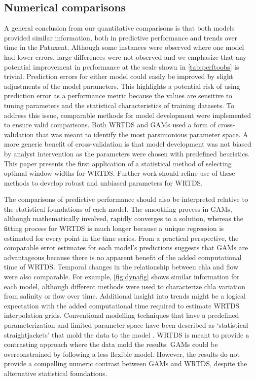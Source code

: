 \documentclass[letterpaper,12pt,oneside]{article}\usepackage[]{graphicx}\usepackage[]{color}
\begin{document}
\subsection*{Numerical comparisons}

A general conclusion from our quantitative comparisons is that both models provided similar information, both in predictive performance and trends over time in the Patuxent.  Although some instances were observed where one model had lower errors,  large differences were not observed and we emphasize that any potential improvement in performance at the scale shown in \cref{tab:perftoobs} is trivial.  Prediction errors for either model could easily be improved by slight adjustments of the model parameters.  This highlights a potential risk of using prediction error as a performance metric because the values are sensitive to tuning parameters and the statistical characteristics of training datasets. To address this issue, comparable methods for model development were implemented to ensure valid comparisons.  Both \ac{WRTDS} and \acp{GAM} used a form of cross-validation that was meant to identify the most parsimonious parameter space.  A more generic benefit of cross-validation is that model development was not biased by analyst intervention as the parameters were chosen with predefined heuristics.  This paper presents the first application of a statistical method of selecting optimal window widths for \ac{WRTDS}.  Further work should refine use of these methods to develop robust and unbiased parameters for \ac{WRTDS}. 
  
The comparisons of predictive performance should also be interpreted relative to the statistical foundations of each model.  The smoothing process in \acp{GAM}, although mathematically involved, rapidly converges to a solution, whereas the fitting process for \ac{WRTDS} is much longer because a unique regression is estimated for every point in the time series.  From a practical perspective, the comparable error estimates for each model's predictions suggests that \acp{GAM} are advantageous because there is no apparent benefit of the added computational time of \ac{WRTDS}.  Temporal changes in the relationship between \ac{chla} and flow were also comparable.  For example, \cref{fig:dynafig} shows similar information for each model, although different methods were used to characterize \ac{chla} variation from salinity or flow over time.  Additional insight into trends might be a logical expectation with the added computational time required to estimate \ac{WRTDS} interpolation grids.  Conventional modelling techniques that have a predefined parameterization and limited parameter space have been described as `statistical straightjackets' that mold the data to the model \citep{Hirsch14b}.  \ac{WRTDS} is meant to provide a contrasting approach where the data mold the results. \acp{GAM} could be overconstrained by following a less flexible model.  However, the results do not provide a compelling numeric contrast between \acp{GAM} and \ac{WRTDS}, despite the alternative statistical foundations.  
\end{document}
